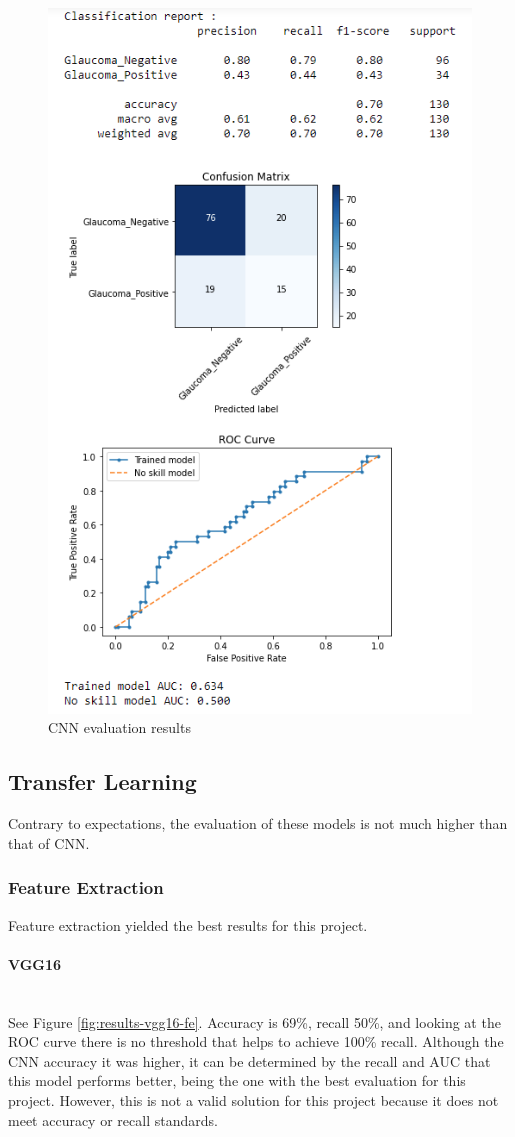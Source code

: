 \documentclass[11pt, a4paper]{article}
\begin{document}
\begin{figure}[H]
	\centering
	\includegraphics[width=12cm]{imgs/results/Results_CNN.png}
	\caption{CNN evaluation results}
	 \label{fig:Results_CNN}
\end{figure}
\subsection{Transfer Learning}
Contrary to expectations, the evaluation of these models is not much higher than that of CNN.
\subsubsection{Feature Extraction}
Feature extraction yielded the best results for this project.
\paragraph{VGG16}\mbox{}\\
See Figure \ref{fig:results-vgg16-fe}. Accuracy is 69\%, recall 50\%, and looking at the ROC curve there is no threshold that helps to achieve 100\% recall. Although the CNN accuracy it was higher, it can be determined by the recall and AUC that this model performs better, being the one with the best evaluation for this project.
However, this is not a valid solution for this project because it does not meet accuracy or recall standards.
\end{document}
